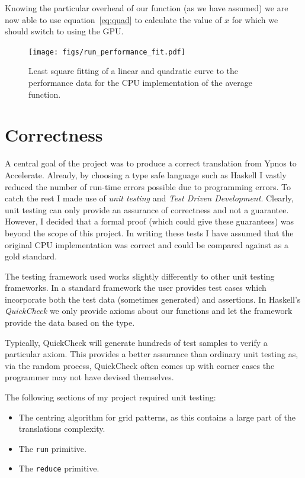 \documentclass[12pt,a4paper,twoside]{scrbook}
\begin{document}
Knowing the particular overhead of our function (as we have assumed) we are now
able to use equation~\ref{eq:quad} to calculate the value of $x$ for which we
should switch to using the GPU.

\begin{figure}[h]
  \texttt{[image: figs/run\_performance\_fit.pdf]}
  \caption{Least square fitting of a linear and quadratic curve to the
    performance data for the CPU implementation of the average function.}
  \label{fig:fitting}
\end{figure}

\section{Correctness}

A central goal of the project was to produce a correct translation from
Ypnos to Accelerate. Already, by choosing a type safe language such as
Haskell I vastly reduced the number of run-time errors possible due to
programming errors. To catch the rest I made use of \emph{unit testing}
and \emph{Test Driven Development}. Clearly, unit testing can only
provide an assurance of correctness and not a guarantee. However, I
decided that a formal proof (which could give these guarantees) was
beyond the scope of this project. In writing these tests I have assumed
that the original CPU implementation was correct and could be compared
against as a gold standard.

The testing framework used works slightly differently to other unit testing
frameworks. In a standard framework the user provides test cases which
incorporate both the test data (sometimes generated) and assertions. In
Haskell's \emph{QuickCheck} we only provide axioms about our functions and let
the framework provide the data based on the type.

Typically, QuickCheck will generate hundreds of test samples to verify a
particular axiom. This provides a better assurance than ordinary unit
testing as, via the random process, QuickCheck often comes up with corner
cases the programmer may not have devised themselves.

The following sections of my project required unit testing:

\begin{itemize}
\item
  The centring algorithm for grid patterns, as this contains a large
  part of the translations complexity.
\item
  The \texttt{run} primitive.
\item
  The \texttt{reduce} primitive.
\end{itemize}
\end{document}
